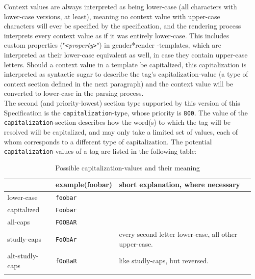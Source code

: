 \documentclass{article}
\newcommand{\GenderRender}{
    gender*render
}
\begin{document}
    Context values are always interpreted as being lower-case (all characters with lower-case versions, at least), meaning no context value with upper-case characters will ever be specified by the specification, and the rendering process interprets every context value as if it was entirely lower-case.
    This includes custom properties ("\texttt{<}\emph{property}\texttt{>}") in \GenderRender-templates, which are interpreted as their lower-case equivalent as well, in case they contain upper-case letters.
    Should a context value in a template be capitalized, this capitalization is interpreted as syntactic sugar to describe the tag's capitalization-value (a type of context section defined in the next paragraph) and the context value will be converted to lower-case in the parsing process.\\

    The second (and priority-lowest) section type supported by this version of this Specification is the \texttt{capitalization}-type, whose priority is \texttt{800}.
    The value of the \texttt{capitalization}-section describes how the word(s) to which the tag will be resolved will be capitalized, and may only take a limited set of values, each of whom corresponds to a different type of capitalization.
    The potential \texttt{capitalization}-values of a tag are listed in the following table:

    \begin{flushleft}
        \begin{center}
            \begin{longtable}{| >{\raggedright\arraybackslash}p{7em} | >{\raggedright\arraybackslash}p{4em} | >{\raggedright\arraybackslash}p{23em} |}
                \hline
                {value} & {example\linebreak (foobar)} & {short explanation, where necessary} \\
                \hline\hline
                lower-case & \texttt{foobar} & \\
                \hline
                capitalized & \texttt{Foobar} & \\
                \hline
                all-caps & \texttt{FOOBAR} & \\
                \hline
                studly-caps & \texttt{FoObAr} & every second letter lower-case, all other upper-case.\\
                \hline
                alt-studly-caps & \texttt{fOoBaR} & like studly-caps, but reversed.\\
                \hline
                \caption{Possible capitalization-values and their meaning}
            \end{longtable}
        \end{center}
    \end{flushleft}
\end{document}
